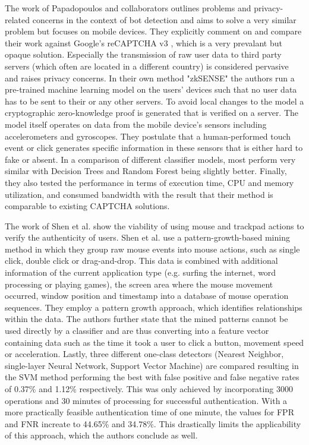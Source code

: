 \documentclass[
    fontsize=12pt,
    headings=small,
    parskip=half,           %
    bibliography=totoc,
    numbers=noenddot,       %
    open=any,               %
    final,                   %
    table
]{scrreprt}
\begin{document}
The work of Papadopoulos and collaborators \cite{PETS2021} outlines problems and privacy-related concerns in the context of bot detection and aims to solve a very similar problem but focuses on mobile devices. They explicitly comment on and compare their work against Google's reCAPTCHA v3 \cite{RECPATCHA_V3}, which is a very prevalant but opaque solution. Especially the transmission of raw user data to third party servers (which often are located in a different country) is considered pervasive and raises privacy concerns. In their own method "zkSENSE" the authors run a pre-trained machine learning model on the users' devices such that no user data has to be sent to their or any other servers. To avoid local changes to the model a cryptographic zero-knowledge proof is generated that is verified on a server. The model itself operates on data from the mobile device's sensors including accelerometers and gyroscopes. They postulate that a human-performed touch event or click generates specific information in these sensors that is either hard to fake or absent. In a comparison of different classifier models, most perform very similar with Decision Trees and Random Forest being slightly better. Finally, they also tested the performance in terms of execution time, CPU and memory utilization, and consumed bandwidth with the result that their method is comparable to existing CAPTCHA solutions.


The work of Shen et al. \cite{6263955} show the viability of using mouse and trackpad actions to verify the authenticity of users. Shen et al. use a pattern-growth-based mining method in which they group raw mouse events into mouse actions, such as single click, double click or drag-and-drop. This data is combined with additional information of the current application type (e.g. surfing the internet, word processing or playing games), the screen area where the mouse movement occurred, window position and timestamp into a database of mouse operation sequences. They employ a pattern growth approach, which identifies relationships within the data. The authors further state that the mined patterns cannot be used directly by a classifier and are thus converting into a feature vector containing data such as the time it took a user to click a button, movement speed or acceleration. Lastly, three different one-class detectors (Nearest Neighbor, single-layer Neural Network, Support Vector Machine) are compared resulting in the SVM method performing the best with false positive and false negative rates of 0.37\% and 1.12\% respectively. This was only achieved by incorporating 3000 operations and 30 minutes of processing for successful authentication. With a more practically feasible authentication time of one minute, the values for FPR and FNR increate to 44.65\% and 34.78\%. This drastically limits the applicability of this approach, which the authors conclude as well.
\end{document}
